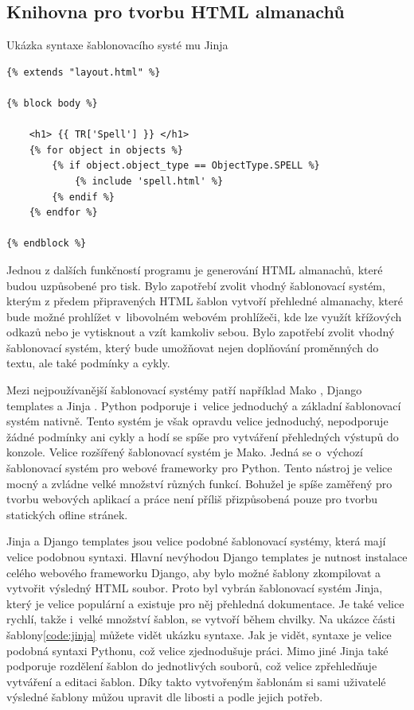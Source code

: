 \documentclass[thesis=B,czech]{resources/FITthesis}[2012/06/26]
\begin{document}
\subsection{Knihovna pro tvorbu HTML almanachů}
\begin{listing}[htbp]
\caption{\label{code:jinja}Ukázka syntaxe šablonovacího systé	mu Jinja}
\begin{verbatim}
{% extends "layout.html" %}

{% block body %}

    <h1> {{ TR['Spell'] }} </h1>
    {% for object in objects %}
        {% if object.object_type == ObjectType.SPELL %}
            {% include 'spell.html' %}
        {% endif %}
    {% endfor %}
    
{% endblock %}

\end{verbatim}
\end{listing}
Jednou z dalších funkčností programu je generování HTML almanachů, které budou uzpůsobené pro tisk. Bylo zapotřebí zvolit vhodný šablonovací systém, kterým z předem připravených HTML šablon vytvoří přehledné almanachy, které bude možné prohlížet v~libovolném webovém prohlížeči, kde lze využít křížových odkazů nebo je vytisknout a vzít kamkoliv sebou. Bylo zapotřebí zvolit vhodný šablonovací systém, který bude umožňovat nejen doplňování proměnných do textu, ale také podmínky a cykly.\par

Mezi nejpoužívanější šablonovací systémy patří například Mako \cite{mako}, Django templates a Jinja \cite{jinja}. Python podporuje i~velice jednoduchý a základní šablonovací systém nativně. Tento systém je však opravdu velice jednoduchý, nepodporuje žádné podmínky ani cykly a hodí se spíše pro vytváření přehledných výstupů do konzole. Velice rozšířený šablonovací systém je Mako. Jedná se o~výchozí šablonovací systém pro webové frameworky pro Python. Tento nástroj je velice mocný a zvládne velké množství různých funkcí. Bohužel je spíše zaměřený pro tvorbu webových aplikací a práce není příliš přizpůsobená pouze pro tvorbu statických ofline stránek.\par

Jinja a Django templates jsou velice podobné šablonovací systémy, která mají velice podobnou syntaxi. Hlavní nevýhodou Django templates je nutnost instalace celého webového frameworku Django, aby bylo možné šablony zkompilovat a vytvořit výsledný HTML soubor. Proto byl vybrán šablonovací systém Jinja, který je velice populární a existuje pro něj přehledná dokumentace. Je také velice rychlí, takže i~velké množství šablon, se vytvoří během chvilky. Na ukázce části šablony\ref{code:jinja} můžete vidět ukázku syntaxe. Jak je vidět, syntaxe je velice podobná syntaxi Pythonu, což velice zjednodušuje práci. Mimo jiné Jinja také podporuje rozdělení šablon do jednotlivých souborů, což velice zpřehledňuje vytváření a editaci šablon. Díky takto vytvořeným šablonám si sami uživatelé výsledné šablony můžou upravit dle libosti a podle jejich potřeb. 
\end{document}
